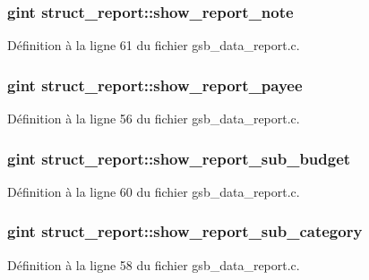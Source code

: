 \subsubsection[{show\_\-report\_\-note}]{\setlength{\rightskip}{0pt plus 5cm}gint {\bf struct\_\-report::show\_\-report\_\-note}}\label{structstruct__report_a57461cdcacc8023823c5185bd9081722}


Définition à la ligne 61 du fichier gsb\_\-data\_\-report.c.

\subsubsection[{show\_\-report\_\-payee}]{\setlength{\rightskip}{0pt plus 5cm}gint {\bf struct\_\-report::show\_\-report\_\-payee}}\label{structstruct__report_a2e199921e77834e4bd8b4bb9416d3d8c}


Définition à la ligne 56 du fichier gsb\_\-data\_\-report.c.

\subsubsection[{show\_\-report\_\-sub\_\-budget}]{\setlength{\rightskip}{0pt plus 5cm}gint {\bf struct\_\-report::show\_\-report\_\-sub\_\-budget}}\label{structstruct__report_a6d983f2d4cd68b474fc460523a3cb6ed}


Définition à la ligne 60 du fichier gsb\_\-data\_\-report.c.

\subsubsection[{show\_\-report\_\-sub\_\-category}]{\setlength{\rightskip}{0pt plus 5cm}gint {\bf struct\_\-report::show\_\-report\_\-sub\_\-category}}\label{structstruct__report_a542aa6291e1522b471303313e850435d}


Définition à la ligne 58 du fichier gsb\_\-data\_\-report.c.

